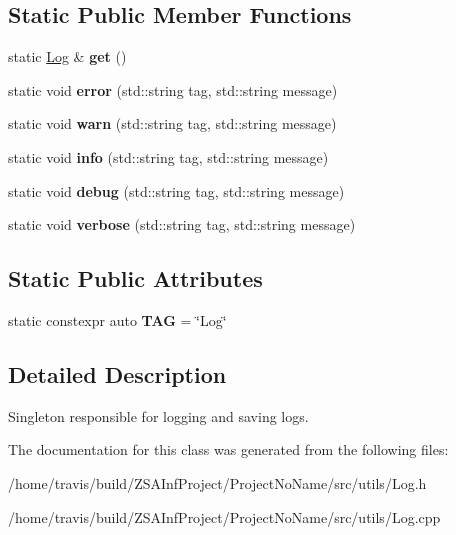 \subsection*{Static Public Member Functions}
\begin{DoxyCompactItemize}
\item 
\hypertarget{classLog_ad33d94e0b040b898ee4b88cc0b4c0941}{static \hyperlink{classLog}{Log} \& {\bfseries get} ()}\label{classLog_ad33d94e0b040b898ee4b88cc0b4c0941}

\item 
\hypertarget{classLog_ac7b6384ef275acd4982544201b21750c}{static void {\bfseries error} (std\-::string tag, std\-::string message)}\label{classLog_ac7b6384ef275acd4982544201b21750c}

\item 
\hypertarget{classLog_aba264cddc8a3e63c41c203e1b365eebc}{static void {\bfseries warn} (std\-::string tag, std\-::string message)}\label{classLog_aba264cddc8a3e63c41c203e1b365eebc}

\item 
\hypertarget{classLog_a90132d669178c96ef6a0ddf2571d38fb}{static void {\bfseries info} (std\-::string tag, std\-::string message)}\label{classLog_a90132d669178c96ef6a0ddf2571d38fb}

\item 
\hypertarget{classLog_a53a0cc512876c782787a3bfa44d26ea2}{static void {\bfseries debug} (std\-::string tag, std\-::string message)}\label{classLog_a53a0cc512876c782787a3bfa44d26ea2}

\item 
\hypertarget{classLog_a5fb96b3db1f6561689f60d3d9dfe3b8d}{static void {\bfseries verbose} (std\-::string tag, std\-::string message)}\label{classLog_a5fb96b3db1f6561689f60d3d9dfe3b8d}

\end{DoxyCompactItemize}
\subsection*{Static Public Attributes}
\begin{DoxyCompactItemize}
\item 
\hypertarget{classLog_ab10f0d7285f93189f88f65b2a589c668}{static constexpr auto {\bfseries T\-A\-G} = \char`\"{}Log\char`\"{}}\label{classLog_ab10f0d7285f93189f88f65b2a589c668}

\end{DoxyCompactItemize}


\subsection{Detailed Description}
Singleton responsible for logging and saving logs. 

The documentation for this class was generated from the following files\-:\begin{DoxyCompactItemize}
\item 
/home/travis/build/\-Z\-S\-A\-Inf\-Project/\-Project\-No\-Name/src/utils/Log.\-h\item 
/home/travis/build/\-Z\-S\-A\-Inf\-Project/\-Project\-No\-Name/src/utils/Log.\-cpp\end{DoxyCompactItemize}
